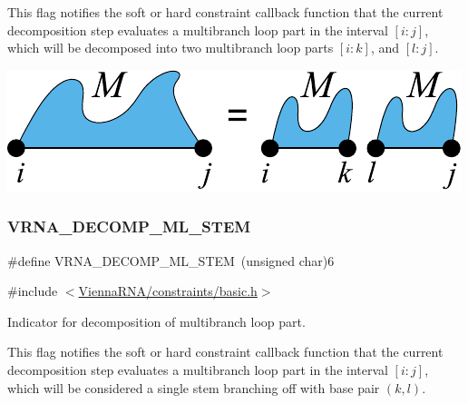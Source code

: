 This flag notifies the soft or hard constraint callback function that the current decomposition step evaluates a multibranch loop part in the interval $[i:j]$, which will be decomposed into two multibranch loop parts $[i:k]$, and $[l:j]$.

 
\begin{DoxyImageNoCaption}
  \mbox{\includegraphics[width=\textwidth,height=\textheight/2,keepaspectratio=true]{decomp_ml_ml_ml}}
\end{DoxyImageNoCaption}
 \mbox{\label{group__constraints_ga4a23054c75d8efc785de50e3ea87602f}} 
\subsubsection{\texorpdfstring{V\+R\+N\+A\+\_\+\+D\+E\+C\+O\+M\+P\+\_\+\+M\+L\+\_\+\+S\+T\+EM}{VRNA\_DECOMP\_ML\_STEM}}
{\footnotesize\ttfamily \#define V\+R\+N\+A\+\_\+\+D\+E\+C\+O\+M\+P\+\_\+\+M\+L\+\_\+\+S\+T\+EM~(unsigned char)6}



{\ttfamily \#include $<$\hyperlink{constraints_2basic_8h}{Vienna\+R\+N\+A/constraints/basic.\+h}$>$}



Indicator for decomposition of multibranch loop part. 

This flag notifies the soft or hard constraint callback function that the current decomposition step evaluates a multibranch loop part in the interval $[i:j]$, which will be considered a single stem branching off with base pair $(k,l)$.

